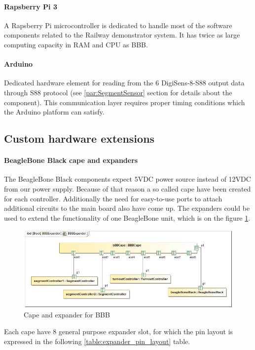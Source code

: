 \paragraph{Rapsberry Pi 3}
A Rapsberry Pi microcontroller is dedicated to handle most of the software components related to the Railway demonstrator system. It has twice as large computing capacity in RAM and CPU as BBB.
\paragraph{Arduino}
Dedicated hardware element for reading from the 6 DigiSens-8-S88 output data through S88 protocol (see \ref{par:SegmentSensor} section for details about the component). This communication layer requires proper timing conditions which the Arduino platform can satisfy.
\subsection{Custom hardware extensions}
\paragraph{BeagleBone Black cape and expanders}\label{par:BBBcape}
The BeagleBone Black components expect 5VDC power source instead of 12VDC from our power supply. Because of that reason a so called cape have been created for each controller. Additionally the need for easy-to-use ports to attach additional circuits to the main board also have come up. The expanders could be used to extend the functionality of one BeagleBone unit, which is on the figure \ref{fig:capeSysml}.

\begin{figure}
	\centering
	\includegraphics[width=150mm]{figures/modes3/BBBExpander.png}
	\caption{Cape and expander for BBB}
	\label{fig:capeSysml}
\end{figure}

Each cape have 8 general purpose expander slot, for which the pin layout is expressed in the following \ref{table:expander_pin_layout} table.

